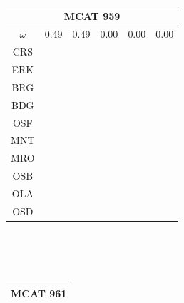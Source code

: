 \documentclass[12pt]{article}
\begin{document}
\begin{landscape}
\begin{figure}
\begin{minipage}[c]{0.3\textwidth}
\begin{tabular}{|c|c|c|c|c|c|}
         \hline \multicolumn{6}{|c|}{MCAT 959} \\ \hline                                                                                                 
         $\omega$&0.49&0.49&0.00&0.00&0.00 \\ \hline                                                                                                     
        CRS&\cellcolor[HTML]{E41A1C}&\cellcolor[HTML]{E41A1C}&\cellcolor[HTML]{E41A1C}&\cellcolor[HTML]{E41A1C}&\cellcolor[HTML]{E41A1C} \\ \hline
        ERK&\cellcolor[HTML]{E41A1C}&\cellcolor[HTML]{E41A1C}&\cellcolor[HTML]{377EB8}&\cellcolor[HTML]{E41A1C}&\cellcolor[HTML]{E41A1C} \\ \hline
        BRG&\cellcolor[HTML]{377EB8}&\cellcolor[HTML]{377EB8}&\cellcolor[HTML]{377EB8}&\cellcolor[HTML]{E41A1C}&\cellcolor[HTML]{E41A1C} \\ \hline
        BDG&\cellcolor[HTML]{377EB8}&\cellcolor[HTML]{4DAF4A}&\cellcolor[HTML]{377EB8}&\cellcolor[HTML]{377EB8}&\cellcolor[HTML]{377EB8} \\ \hline
        OSF&\cellcolor[HTML]{4DAF4A}&\cellcolor[HTML]{4DAF4A}&\cellcolor[HTML]{4DAF4A}&\cellcolor[HTML]{4DAF4A}&\cellcolor[HTML]{377EB8} \\ \hline
        MNT&\cellcolor[HTML]{984EA3}&\cellcolor[HTML]{984EA3}&\cellcolor[HTML]{984EA3}&\cellcolor[HTML]{4DAF4A}&\cellcolor[HTML]{4DAF4A} \\ \hline
        MRO&\cellcolor[HTML]{FF7F00}&\cellcolor[HTML]{984EA3}&\cellcolor[HTML]{984EA3}&\cellcolor[HTML]{4DAF4A}&\cellcolor[HTML]{4DAF4A} \\ \hline
        OSB&\cellcolor[HTML]{FF7F00}&\cellcolor[HTML]{984EA3}&\cellcolor[HTML]{984EA3}&\cellcolor[HTML]{984EA3}&\cellcolor[HTML]{4DAF4A} \\ \hline
        OLA&\cellcolor[HTML]{FF7F00}&\cellcolor[HTML]{FF7F00}&\cellcolor[HTML]{FF7F00}&\cellcolor[HTML]{984EA3}&\cellcolor[HTML]{984EA3} \\ \hline
        OSD&\cellcolor[HTML]{FFFF33}&\cellcolor[HTML]{FFFF33}&\cellcolor[HTML]{FFFF33}&\cellcolor[HTML]{984EA3}&\cellcolor[HTML]{984EA3} \\ \hline
\end{tabular}\\$~$\\$~$\\
\begin{tabular}{|c|c|c|c|c|c|}
         \hline \multicolumn{6}{|c|}{MCAT 961} \\ \hline

\end{tabular}
\end{minipage}
\end{figure}
\end{landscape}
\end{document}
